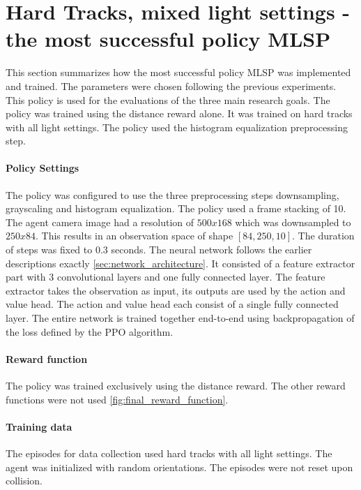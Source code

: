 \section{Hard Tracks, mixed light settings - the most successful policy \ac{MLSP}}
\label{sec:most_successful_policy}

This section summarizes how the most successful policy \ac{MLSP} was implemented and trained. The parameters were chosen following the previous experiments. This policy is used for the evaluations of the three main research goals.
The policy was trained using the distance reward alone. It was trained on hard tracks with all light settings. The policy used the histogram equalization preprocessing step.

\paragraph{Policy Settings}
The policy was configured to use the three preprocessing steps downsampling, grayscaling and histogram equalization. The policy used a frame stacking of 10. The agent camera image had a resolution of $500x168$ which was downsampled to $250x84$. This results in an observation space of shape $[84, 250, 10]$. The duration of steps was fixed to $0.3$ seconds.
The neural network follows the earlier descriptions exactly \ref{sec:network_architecture}. It consisted of a feature extractor part with 3 convolutional layers and one fully connected layer. The feature extractor takes the observation as input, its outputs are used by the action and value head. The action and value head each consist of a single fully connected layer. The entire network is trained together end-to-end using backpropagation of the loss defined by the PPO algorithm.

\paragraph{Reward function}
The policy was trained exclusively using the distance reward. The other reward functions were not used \ref{fig:final_reward_function}.

\paragraph{Training data}
The episodes for data collection used hard tracks with all light settings. The agent was initialized with random orientations. The episodes were not reset upon collision.

